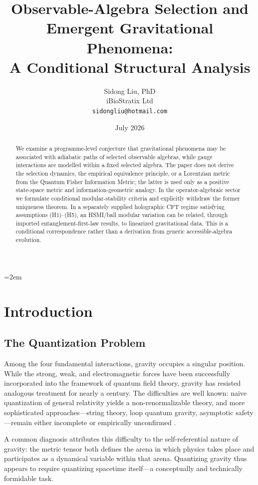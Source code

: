 \documentclass[12pt,a4paper]{article}
\title{Observable-Algebra Selection and Emergent Gravitational Phenomena:\\
A Conditional Structural Analysis}
\author{
  Sidong Liu, PhD \\
  iBioStratix Ltd \\
  \texttt{sidongliu@hotmail.com}
}
\date{July 2026}
\begin{document}
\emergencystretch=2em
\raggedbottom
{}

\maketitle

\begin{abstract}
We examine a programme-level conjecture that gravitational phenomena may be associated with adiabatic paths of selected observable algebras, while gauge interactions are modelled within a fixed selected algebra.  The paper does not derive the selection dynamics, the empirical equivalence principle, or a Lorentzian metric from the Quantum Fisher Information Metric; the latter is used only as a positive state-space metric and information-geometric analogy.
In the operator-algebraic sector we formulate conditional modular-stability criteria and explicitly withdraw the former uniqueness theorem.  In a separately supplied holographic CFT regime satisfying assumptions (H1)--(H5), an HSMI/ball modular variation can be related, through imported entanglement-first-law results, to linearized gravitational data.  This is a conditional correspondence rather than a derivation from generic accessible-algebra evolution.
\end{abstract}

\section{Introduction}
\label{sec:intro}

\subsection{The Quantization Problem}

Among the four fundamental interactions, gravity occupies a singular position. While the strong, weak, and electromagnetic forces have been successfully incorporated into the framework of quantum field theory, gravity has resisted analogous treatment for nearly a century. The difficulties are well known: naive quantization of general relativity yields a non-renormalizable theory, and more sophisticated approaches—string theory, loop quantum gravity, asymptotic safety—remain either incomplete or empirically unconfirmed \cite{Kiefer2012}.

A common diagnosis attributes this difficulty to the self-referential nature of gravity: the metric tensor both defines the arena in which physics takes place and participates as a dynamical variable within that arena. Quantizing gravity thus appears to require quantizing spacetime itself—a conceptually and technically formidable task.
\end{document}
